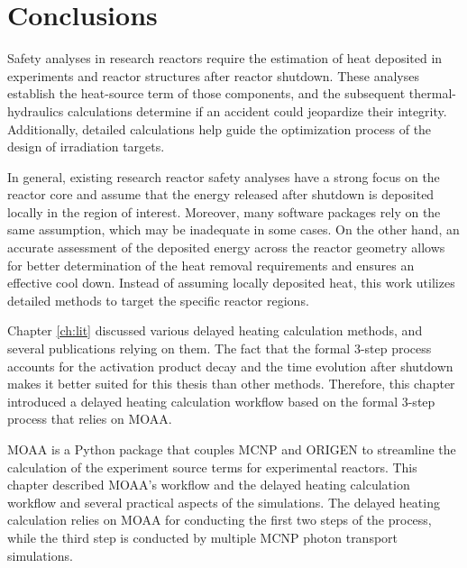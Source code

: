 \section{Conclusions}

Safety analyses in research reactors require the estimation of heat deposited in experiments and reactor structures after reactor shutdown.
These analyses establish the heat-source term of those components, and the subsequent thermal-hydraulics calculations determine if an accident could jeopardize their integrity.
Additionally, detailed calculations help guide the optimization process of the design of irradiation targets.

In general, existing research reactor safety analyses have a strong focus on the reactor core and assume that the energy released after shutdown is deposited locally in the region of interest.
Moreover, many software packages rely on the same assumption, which may be inadequate in some cases.
On the other hand, an accurate assessment of the deposited energy across the reactor geometry allows for better determination of the heat removal requirements and ensures an effective cool down.
Instead of assuming locally deposited heat, this work utilizes detailed methods to target the specific reactor regions.

Chapter \ref{ch:lit} discussed various delayed heating calculation methods, and several publications relying on them.
The fact that the formal 3-step process accounts for the activation product decay and the time evolution after shutdown makes it better suited for this thesis than other methods.
Therefore, this chapter introduced a delayed heating calculation workflow based on the formal 3-step process that relies on MOAA.

MOAA is a Python package that couples MCNP and ORIGEN to streamline the calculation of the experiment source terms for experimental reactors.
This chapter described MOAA's workflow and the delayed heating calculation workflow and several practical aspects of the simulations.
The delayed heating calculation relies on MOAA for conducting the first two steps of the process, while the third step is conducted by multiple MCNP photon transport simulations.

